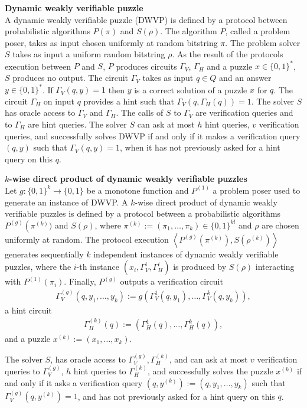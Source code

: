 \begin{definition} {\textbf{Dynamic weakly verifiable puzzle}}\\
  A dynamic weakly verifiable puzzle (DWVP) is defined by a protocol between probabilistic algorithms $P(\pi)$ and $S(\rho)$.
  The algorithm $P$, called a problem poser, takes as input chosen uniformly at random bitstring $\pi$.
  The problem solver $S$ takes as input a uniform random bitstring $\rho$.
  As the result of the protocols execution between $P$ and $S$,
  $P$ produces circuits $\Gamma_{V}$, $\Gamma_{H}$ and a puzzle $x \in \{0,1\}^{*}$, $S$ produces no output.
  The circuit $\Gamma_{V}$ takes as input $q \in Q$ and an answer $y \in \{0,1\}^*$.
  If $\Gamma_V(q,y) = 1$ then $y$ is a correct solution of a puzzle $x$ for $q$.
  The circuit $\Gamma_H$ on input $q$ provides a hint such that $\Gamma_V(q,\Gamma_H(q)) = 1$.
  The solver $S$ has oracle access to $\Gamma_V$ and $\Gamma_H$.
  The calls of $S$ to $\Gamma_V$ are verification queries and to $\Gamma_H$ are hint queries.
  The solver $S$ can ask at most $h$ hint queries, $v$ verification queries, and successfully solves DWVP if and only if
  it makes a verification query $(q,y)$ such that $\Gamma_V(q,y) = 1$, when it has not previously asked for a hint query on this $q$.
\end{definition}
%
\begin{definition}{\textbf{$k$-wise direct product of dynamic weakly verifiable puzzles}}\\
Let $g: \{0,1\}^{k} \rightarrow \{0,1\}$ be a monotone function and $P^{(1)}$ a problem poser used to generate an instance of DWVP.
A $k$-wise direct product of dynamic weakly verifiable puzzles is defined by a protocol between a probabilistic algorithms $P^{(g)}\left(\pi^{(k)})$ and
$S(\rho)$, where $\pi^{(k)} := (\pi_1, \dots, \pi_k) \in \{0,1\}^{kl}$ and $\rho$ are chosen uniformly at random.
The protocol execution $\left\langle P^{(g)}\left(\pi^{(k)}\right), S(\rho^{(k)}) \right\rangle$ generates sequentially $k$ independent instances of dynamic weakly verifiable puzzles,
where the $i$-th instance $(x_i, \Gamma_V^{i}, \Gamma_H^{i} )$ is produced by $S(\rho)$ interacting with $P^{(1)}(\pi_i)$.
Finally, $P^{(g)}$ outputs a verification circuit
\begin{align*}
  \Gamma_V^{(g)} (q, y_1, \dots, y_k) := g(\Gamma_V^{1}(q, y_1), \dots, \Gamma_V^{k}(q, y_k)),
\end{align*}
a hint circuit
\begin{align*}
  \Gamma_H^{(k)} (q) := (\Gamma_H^{1}(q), \dots, \Gamma_H^{k}(q)),
\end{align*}
and a puzzle $x^{(k)} := (x_1, \dots, x_k)$.

The solver $S$, has oracle access to $\Gamma_V^{(g)}, \Gamma_H^{(k)}$, and
can ask at most $v$ verification queries to $\Gamma_V^{(g)}$, $h$ hint queries to $\Gamma_H^{(k)}$, and successfully solves the puzzle $x^{(k)}$
if and only if it asks a verification query $(q, y^{(k)}) := (q, y_1, \dots, y_k)$ such that $\Gamma_V^{(g)}(q, y^{(k)}) = 1$, and has not previously asked for a hint query on this $q$.
\end{definition}
